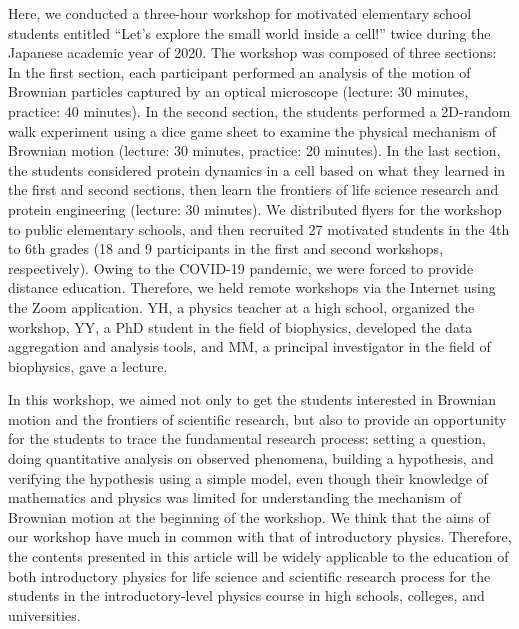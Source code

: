 \documentclass[10pt, aps, prb, preprint, longbibliography, superscriptaddress]{revtex4-2}
\begin{document}
Here, we conducted a three-hour workshop for motivated elementary school students entitled
``Let's explore the small world inside a cell!'' twice during the Japanese academic year of 2020.
The workshop was composed of three sections:
In the first section, each participant performed an analysis of the motion of Brownian particles
captured by an optical microscope (lecture: 30 minutes, practice: 40 minutes).
In the second section, the students performed a 2D-random walk experiment
using a dice game sheet to examine the physical mechanism of Brownian motion (lecture: 30 minutes, practice: 20 minutes).
In the last section, the students considered protein dynamics in a cell based on
what they learned in the first and second sections,
then learn the frontiers of life science research and protein engineering (lecture: 30 minutes).
We distributed flyers for the workshop to public elementary schools,
and then recruited 27 motivated students in the 4th to 6th grades
(18 and 9 participants in the first and second workshops, respectively).
Owing to the COVID-19 pandemic, we were forced to provide distance education.
Therefore, we held remote workshops via the Internet using the Zoom application.
YH, a physics teacher at a high school, organized the workshop,
YY, a PhD student in the field of biophysics, developed the data aggregation and analysis tools,
and MM, a principal investigator in the field of biophysics, gave a lecture.

In this workshop, we aimed not only to get the students interested in
Brownian motion and the frontiers of scientific research,
but also to provide an opportunity for the students to trace the fundamental research process:
setting a question, doing quantitative analysis on observed phenomena,
building a hypothesis, and verifying the hypothesis using a simple model,
even though their knowledge of mathematics and physics was limited
for understanding the mechanism of Brownian motion at the beginning of the workshop.
We think that the aims of our workshop have much in common with that of introductory physics.
Therefore, the contents presented in this article will be widely applicable to the education of
both introductory physics for life science\cite{moore_2014, mochrie_2016}
and scientific research process for the students
in the introductory-level physics course in high schools, colleges, and universities.
\end{document}
